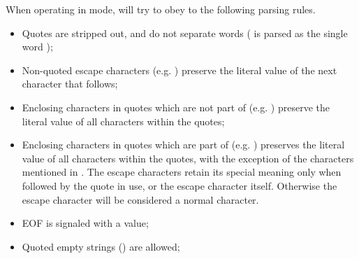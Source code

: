 When operating in \POSIX{} mode,  will try to obey to the
following parsing rules.

\begin{itemize}
\item Quotes are stripped out, and do not separate words
      ( is parsed as the single word
      );
\item Non-quoted escape characters (e.g. \character{\textbackslash})
      preserve the literal value of the next character that follows;
\item Enclosing characters in quotes which are not part of
       (e.g. ) preserve the literal
      value of all characters within the quotes;
\item Enclosing characters in quotes which are part of
       (e.g. ) preserves the literal
      value of all characters within the quotes, with the exception of
      the characters mentioned in . The escape characters
      retain its special meaning only when followed by the quote in use,
      or the escape character itself. Otherwise the escape character
      will be considered a normal character.
\item EOF is signaled with a  value;
\item Quoted empty strings () are allowed;
\end{itemize}

